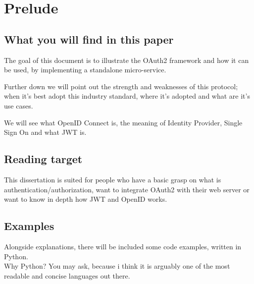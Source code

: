 \section{Prelude}

\subsection{What you will find in this paper}
The goal of this document is to illustrate the OAuth2 framework and how it can
be used, by implementing a standalone micro-service.

Further down we will point out the strength and weaknesses of this protocol;
%
when it's best adopt this industry standard, where it's adopted and what are
it's use cases.

We will see what OpenID Connect is, the meaning of Identity Provider, Single
Sign On and what JWT is.


\subsection{Reading target}
This dissertation is suited for people who have a basic grasp on what is
authentication/authorization,
%
want to integrate OAuth2 with their web server
%
or want to know in depth how JWT and OpenID works.


\subsection{Examples}
Alongside explanations, there will be included some code examples, written in
Python.
\\
Why Python? You may ask,
%
because i think it is arguably one of the most readable
and concise languages out there.
